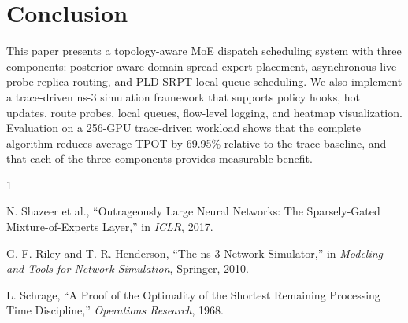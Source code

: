 \documentclass[10pt,conference]{IEEEtran}
\begin{document}
\section{Conclusion}

This paper presents a topology-aware MoE dispatch scheduling system with three components: posterior-aware domain-spread expert placement, asynchronous live-probe replica routing, and PLD-SRPT local queue scheduling. We also implement a trace-driven ns-3 simulation framework that supports policy hooks, hot updates, route probes, local queues, flow-level logging, and heatmap visualization. Evaluation on a 256-GPU trace-driven workload shows that the complete algorithm reduces average TPOT by 69.95\% relative to the trace baseline, and that each of the three components provides measurable benefit.

\begin{thebibliography}{1}

N. Shazeer et al., ``Outrageously Large Neural Networks: The Sparsely-Gated Mixture-of-Experts Layer,'' in \emph{ICLR}, 2017.

G. F. Riley and T. R. Henderson, ``The ns-3 Network Simulator,'' in \emph{Modeling and Tools for Network Simulation}, Springer, 2010.

L. Schrage, ``A Proof of the Optimality of the Shortest Remaining Processing Time Discipline,'' \emph{Operations Research}, 1968.

\end{thebibliography}
\end{document}
